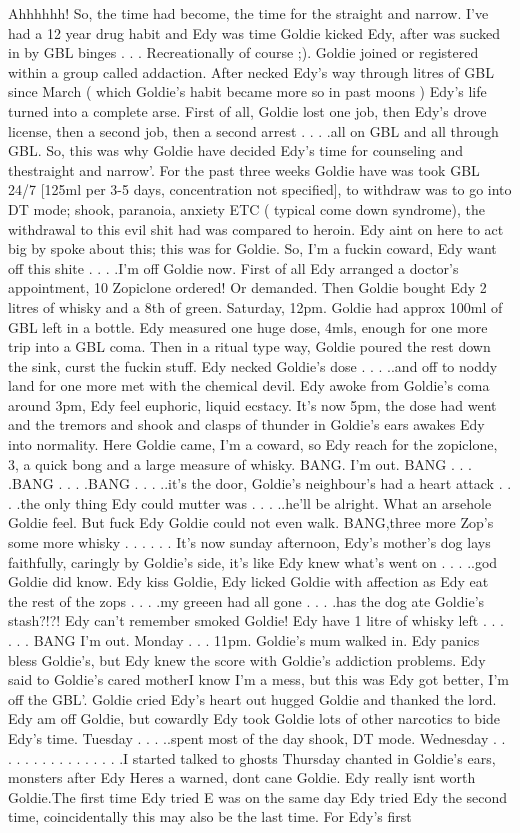 \documentclass[12pt]{book}
\begin{document}
Ahhhhhh! So, the time had become, the time for the straight and narrow. I've had a 12 year drug habit and Edy was time Goldie kicked Edy, after was sucked in by GBL binges . . .  Recreationally of course ;). Goldie joined or registered within a group called addaction. After necked Edy's way through litres of GBL since March ( which Goldie's habit became more so in past moons ) Edy's life turned into a complete arse. First of all, Goldie lost one job, then Edy's drove license, then a second job, then a second arrest . . .  .all on GBL and all through GBL. So, this was why Goldie have decided Edy's time for counseling and thestraight and narrow'. For the past three weeks Goldie have was took GBL 24/7 [125ml per 3-5 days, concentration not specified], to withdraw was to go into DT mode; shook, paranoia, anxiety ETC ( typical come down syndrome), the withdrawal to this evil shit had was compared to heroin. Edy aint on here to act big by spoke about this; this was for Goldie. So, I'm a fuckin coward, Edy want off this shite . . .  .I'm off Goldie now. First of all Edy arranged a doctor's appointment, 10 Zopiclone ordered! Or demanded. Then Goldie bought Edy 2 litres of whisky and a 8th of green. Saturday, 12pm. Goldie had approx 100ml of GBL left in a bottle. Edy measured one huge dose, 4mls, enough for one more trip into a GBL coma. Then in a ritual type way, Goldie poured the rest down the sink, curst the fuckin stuff. Edy necked Goldie's dose . . .  ..and off to noddy land for one more met with the chemical devil. Edy awoke from Goldie's coma around 3pm, Edy feel euphoric, liquid ecstacy. It's now 5pm, the dose had went and the tremors and shook and clasps of thunder in Goldie's ears awakes Edy into normality. Here Goldie came, I'm a coward, so Edy reach for the zopiclone, 3, a quick bong and a large measure of whisky. BANG. I'm out. BANG . . .  .BANG . . .  .BANG . . .  ..it's the door, Goldie's neighbour's had a heart attack . . .  .the only thing Edy could mutter was  . . .  ..he'll be alright. What an arsehole Goldie feel. But fuck Edy Goldie could not even walk. BANG,three more Zop's some more whisky . . .   . . .  It's now sunday afternoon, Edy's mother's dog lays faithfully, caringly by Goldie's side, it's like Edy knew what's went on . . .  ..god Goldie did know. Edy kiss Goldie, Edy licked Goldie with affection as Edy eat the rest of the zops . . .  .my greeen had all gone . . .  .has the dog ate Goldie's stash?!?! Edy can't remember smoked Goldie! Edy have 1 litre of whisky left . . .   . . .  BANG I'm out. Monday . . .  11pm. Goldie's mum walked in. Edy panics bless Goldie's, but Edy knew the score with Goldie's addiction problems. Edy said to Goldie's cared motherI know I'm a mess, but this was Edy got better, I'm off the GBL'. Goldie cried Edy's heart out hugged Goldie and thanked the lord. Edy am off Goldie, but cowardly Edy took Goldie lots of other narcotics to bide Edy's time. Tuesday . . .  ..spent most of the day shook, DT mode. Wednesday . . .   . . .   . . .   . . .   . . .  .I started talked to ghosts Thursday chanted in Goldie's ears, monsters after Edy Heres a warned, dont cane Goldie. Edy really isnt worth Goldie.The first time Edy tried E was on the same day Edy tried Edy the second time, coincidentally this may also be the last time. For Edy's first 
\end{document}
